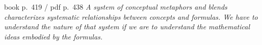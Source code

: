 \begin{ideabox}[title={Their moral, and it is a good one}]
\begin{bookquote}{book p.~419 / pdf p.~438}
\textit{A system of conceptual metaphors and blends characterizes systematic relationships between
concepts and formulas. We have to understand the nature of that system if we are to understand the
mathematical ideas embodied by the formulas.}
\end{bookquote}
\end{ideabox}
